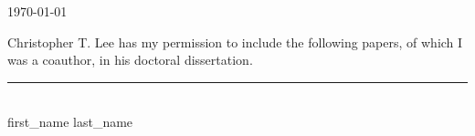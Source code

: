 \documentclass{article}
\begin{document}
\today

\bigskip
\bigskip
\bigskip

Christopher T. Lee has my permission to include the following papers, of
which I was a coauthor, in his doctoral dissertation.


\bigskip
\bigskip
\bigskip

\noindent
\rule{5cm}{1pt} \\
{{ first_name }} {{ last_name }}
\end{document}
